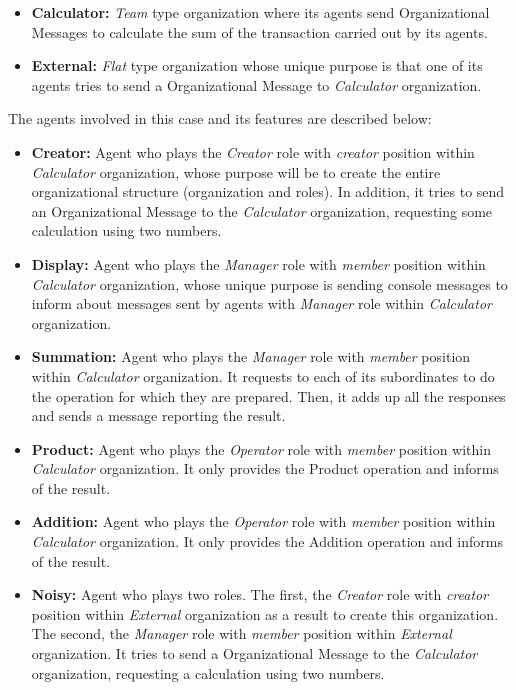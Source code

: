 \begin{itemize}
\item \textbf{Calculator:} \textit{Team} type organization where its agents send Organizational Messages to
  calculate the sum of the transaction carried out by its agents.
\item \textbf{External:} \textit{Flat} type organization whose unique purpose is that one of its agents
  tries to send a Organizational Message to \textit{Calculator} organization.
\end{itemize}

The agents involved in this case and its features are described below:

\begin{itemize}
\item \textbf{Creator:} Agent who plays the \textit{Creator} role with \textit{creator} position within
  \textit{Calculator} organization, whose purpose will be to create the entire organizational structure
  (organization and roles). In addition, it tries to send an Organizational Message to the \textit{Calculator}
  organization, requesting some calculation using two numbers.
\item \textbf{Display:} Agent who plays the \textit{Manager} role with \textit{member} position within
  \textit{Calculator} organization, whose unique purpose is sending console messages to inform about messages
  sent by agents with \textit{Manager} role within \textit{Calculator} organization.
\item \textbf{Summation:} Agent who plays the \textit{Manager} role with \textit{member} position within
  \textit{Calculator} organization. It requests to each of its subordinates to do the operation for which
  they are prepared. Then, it adds up all the responses and sends a message reporting the result.
\item \textbf{Product:} Agent who plays the \textit{Operator} role with \textit{member} position within
  \textit{Calculator} organization. It only provides the Product operation and informs of the result.
\item \textbf{Addition:} Agent who plays the \textit{Operator} role with \textit{member} position within
  \textit{Calculator} organization. It only provides the Addition operation and informs of the result.
\item \textbf{Noisy:} Agent who plays two roles. The first, the \textit{Creator} role with \textit{creator}
  position within \textit{External} organization as a result to create this organization. The second, the
  \textit{Manager} role with \textit{member} position within \textit{External} organization. It tries to send
  a Organizational Message to the \textit{Calculator} organization, requesting a calculation using two
  numbers.
\end{itemize}

